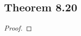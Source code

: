 \documentclass[../../main.tex]{subfiles}
\begin{document}
\subsection{Theorem 8.20}
\begin{wts}

\end{wts}
\begin{proof}

\end{proof}
\end{document}
